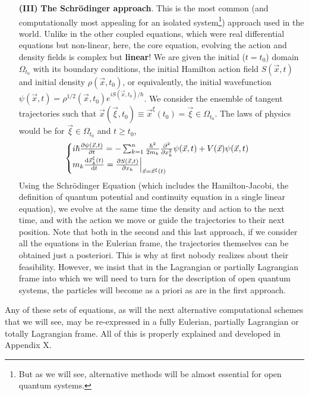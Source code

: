 \documentclass[11pt, a4paper]{article} %
\begin{document}
\begin{itemize}
\item[{\bf (III)}] {\bf The Schrödinger approach}. This is the most common (and computationally most appealing for an isolated system\footnote{But as we will see, alternative methods will be almost essential for open quantum systems.}) approach used in the world. Unlike in the other coupled equations, which were real differential equations but non-linear, here, the core equation, evolving the action and density fields is complex but {\bf linear}! We are given the initial ($t=t_0$) domain $\Omega_{t_0}$ with its boundary conditions, the initial Hamilton action field $S(\vec{x},t)$ and initial density $\rho(\vec{x},t_0)$, or equivalently, the initial wavefunction $\psi(\vec{x},t)=\rho^{1/2}(\vec{x},t_0)e^{iS(\vec{x},t_0)/\hbar}$. We consider the ensemble of tangent trajectories such that $\vec{x}(\vec{\xi},t_0)\equiv\vec{x}^\xi(t_0)=\vec{\xi}\in\Omega_{t_0}$. The laws of physics would be for $\vec{\xi}\in\Omega_{t_0}$ and $t\geq t_0$,
\begin{equation}
\begin{cases}
i\hbar \pdv{\psi(\vec{x},t)}{t}=-\sum_{k=1}^n\frac{\hbar^2}{2m_k}\pdv[2]{}{x_k}\psi(\vec{x},t)+V(\vec{x})\psi(\vec{x},t)\\
m_k\dv{\vec{x}_k^\xi(t)}{t}=\pdv{S(\vec{x},t)}{x_k}\Big\rvert_{\vec{x}=\vec{x}^\xi(t)} \\
\end{cases}
\end{equation}
Using the Schrödinger Equation (which includes the Hamilton-Jacobi, the definition of quantum potential and continuity equation in a single linear equation), we evolve at the same time the density and action to the next time, and with the action we move or guide the trajectories to their next position. Note that both in the second and this last approach, if we consider all the equations in the Eulerian frame, the trajectories themselves can be obtained just a posteriori. This is why at first nobody realizes about their feasibility. However, we insist that in the Lagrangian or partially Lagrangian frame into which we will need to turn for the description of open quantum systems, the particles will become as a priori as are in the first approach.
\end{itemize}

Any of these sets of equations, as will the next alternative computational schemes that we will see, may be re-expressed in a fully Eulerian, partially Lagrangian or totally Lagrangian frame. All of this is properly explained and developed in Appendix X.
\end{document}
